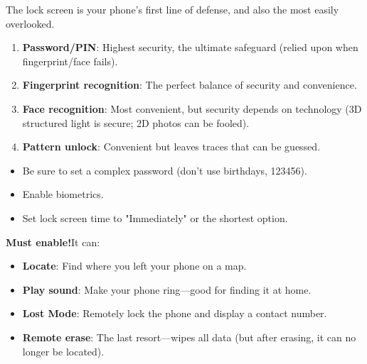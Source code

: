 


The lock screen is your phone's first line of defense, and also the most easily overlooked.


\begin{enumerate}
  \item \textbf{Password/PIN}: Highest security, the ultimate safeguard (relied upon when fingerprint/face fails).
  \item \textbf{Fingerprint recognition}: The perfect balance of security and convenience.
  \item \textbf{Face recognition}: Most convenient, but security depends on technology (3D structured light is secure; 2D photos can be fooled).
  \item \textbf{Pattern unlock}: Convenient but leaves traces that can be guessed.
\end{enumerate}


\begin{itemize}
  \item Be sure to set a complex password (don't use birthdays, 123456).
  \item Enable biometrics.
  \item Set lock screen time to "Immediately" or the shortest option.
\end{itemize}


\textbf{Must enable!}It can:

\begin{itemize}
  \item \textbf{Locate}: Find where you left your phone on a map.
  \item \textbf{Play sound}: Make your phone ring—good for finding it at home.
  \item \textbf{Lost Mode}: Remotely lock the phone and display a contact number.
  \item \textbf{Remote erase}: The last resort—wipes all data (but after erasing, it can no longer be located).
\end{itemize}

